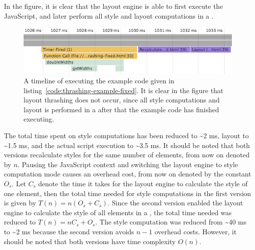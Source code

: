\documentclass[a4paper,11pt]{kth-mag}
\begin{document}
        In the figure, it is clear that the \gls{layout engine} is able to first execute the \gls{JavaScript}, and later perform all style and layout computations in a .
        \begin{figure}[ht]
          \centering
          \includegraphics[scale=0.7]{images/layout-thrashing-example-1-fixed}
          \caption{A timeline of executing the example code given in listing~\ref{code:thrashing-example-fixed}. It is clear in the figure that \gls{layout thrashing} does not occur, since all style computations and layout is performed in a  after that the example code has finished executing.}
          \label{fig:layout-thrashing-example-1-fixed}
        \end{figure}

        The total time spent on style computations has been reduced to \textasciitilde2 ms, layout to \textasciitilde1.5 ms, and the actual script execution to \textasciitilde3.5 ms.
        It should be noted that both versions recalculate styles for the same number of \glspl{element}, from now on denoted by $n$.
        Pausing the \gls{JavaScript} context and switching the \gls{layout engine} to style computation mode causes an overhead cost, from now on denoted by the constant $O_{s}$.
        Let $C_{s}$ denote the time it takes for the \gls{layout engine} to calculate the style of one \gls{element}, then the total time needed for style computations in the first version is given by $T(n) = n(O_s + C_s)$.
        Since the second version enabled the \gls{layout engine} to calculate the style of all \glspl{element} in a , the total time needed was reduced to $T(n) = nC_s + O_s$.
        The style computation was reduced from \textasciitilde40 ms to \textasciitilde2 ms because the second version avoids $n - 1$ overhead costs.
        However, it should be noted that both versions have time complexity $O(n)$.
        
\end{document}
